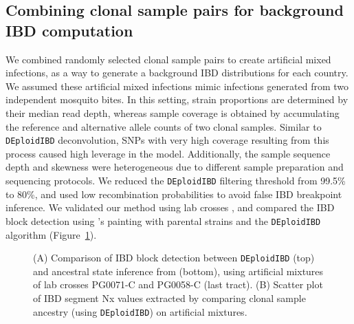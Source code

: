 \documentclass[9pt]{article}
\begin{document}
\subsection{Combining clonal sample pairs for background IBD computation}
We combined randomly selected clonal sample pairs to create artificial mixed infections, as a way to generate a background IBD distributions for each country. We assumed these artificial mixed infections mimic infections generated from two independent mosquito bites. In this setting, strain proportions are determined by their median read depth, whereas sample coverage is obtained by accumulating the reference and alternative allele counts of two clonal samples. Similar to {\tt DEploidIBD} deconvolution, SNPs with very high coverage resulting from this process caused high leverage in the model. Additionally, the sample sequence depth and skewness were heterogeneous due to different sample preparation and sequencing protocols. We reduced the {\tt DEploidIBD} filtering threshold from 99.5\% to 80\%, and used low recombination probabilities to avoid false IBD breakpoint inference. We validated our method using lab crosses \citep{Miles2016}, and compared the IBD block detection using \citet{Li2003}'s painting with parental strains and the {\tt DEploidIBD} algorithm (Figure~\ref{fig:bgibd}).

\begin{figure}[ht]
  \centering{}
  \caption{(A) Comparison of IBD block detection between {\tt DEploidIBD} (top) and ancestral state inference from \citet{Li2003} (bottom), using artificial mixtures of lab crosses PG0071-C and PG0058-C (last tract). (B) Scatter plot of IBD segment Nx values extracted by comparing clonal sample ancestry (using {\tt DEploidIBD}) on artificial mixtures.}\label{fig:bgibd}
\end{figure}
\end{document}
